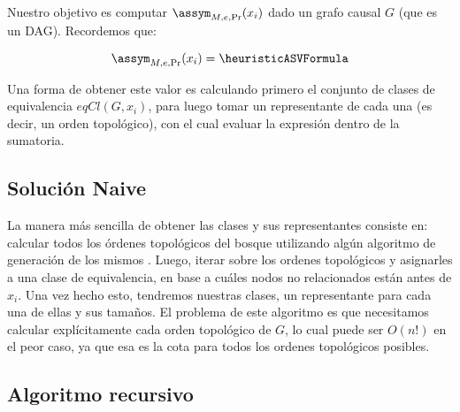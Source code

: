 \begin{comment}
Algoritmo exacto para clases de equivalencias en “árboles”
    Forma Naive
    Cálculo de clases de equivalencia para cada unrelated tree
    Combinar clases de los unrelated tree con ancestros y descendientes
        Combinación con descendientes
        Combinación con ancestros
    Complejidad total
        Complejidad de #UnrEC
        Complejidad de #eqClass
        Complejidad total del algoritmo
\end{comment}

Nuestro objetivo es computar $\assym_{M,e,\Pr}(x_i)$ dado un grafo causal $G$ (que es un DAG). Recordemos que:

$$\assym_{M,e,\Pr}(x_i) = \heuristicASVFormula$$


Una forma de obtener este valor es calculando primero el conjunto de clases de equivalencia $eqCl(G, x_i)$, para luego tomar un representante de cada una (es decir, un orden topológico), con el cual evaluar la expresión dentro de la sumatoria. 

\subsection{Solución Naive} \label{alg:naiveAlgorithmEquivalenceClass}


La manera más sencilla de obtener las clases y sus representantes consiste en: calcular todos los órdenes topológicos del bosque utilizando algún algoritmo de generación de los mismos \cite{KNUTH1974153}. Luego, iterar sobre los ordenes topológicos y asignarles a una clase de equivalencia, en base a cuáles nodos no relacionados están antes de $x_i$. Una vez hecho esto, tendremos nuestras clases, un representante para cada una de ellas y sus tamaños. El problema de este algoritmo es que necesitamos calcular explícitamente cada orden topológico de $G$, lo cual puede ser $O(n!)$ en el peor caso, ya que esa es la cota para todos los ordenes topológicos posibles.

\subsection{Algoritmo recursivo}

